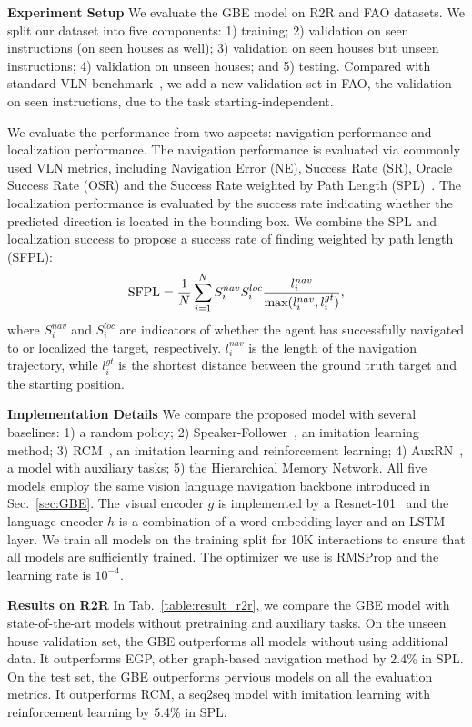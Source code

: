 \documentclass[final]{cvpr}
\begin{document}
\noindent\textbf{Experiment Setup}
We evaluate the GBE model on R2R and FAO datasets. 
We split our dataset into five components: 1) training; 2) validation on seen instructions (on seen houses as well); 3) validation on seen houses but unseen instructions; 4) validation on unseen houses; and 5) testing. Compared with standard VLN benchmark~\cite{anderson2018vision}, we add a new validation set in FAO, the validation on seen instructions, due to the task starting-independent. 

We evaluate the performance from two aspects: navigation performance and localization performance. The navigation performance is evaluated via commonly used VLN metrics, including Navigation Error (NE), Success Rate (SR), Oracle Success Rate (OSR) and the Success Rate weighted by Path Length (SPL)~\cite{anderson2018on}. 
The localization performance is evaluated by the success rate indicating whether the predicted direction is located in the bounding box. We combine the SPL and localization success to propose a success rate of finding weighted by path length (SFPL): 
\begin{equation}
    \textnormal{SFPL} = \frac{1}{N} \sum_{i=1}^{N} S^{nav}_i S^{loc}_i \frac{l^{nav}_i}{\textnormal{max}(l^{nav}_i, l^{gt}_i)}, 
\end{equation}
where $S^{nav}_i$ and $S^{loc}_i$ are indicators of whether the agent has successfully navigated to or localized the target, respectively. $l^{nav}_i$ is the length of the navigation trajectory, while $l^{gt}_i$ is the shortest distance between the ground truth target and the starting position. 

\noindent\textbf{Implementation Details}
We compare the proposed model with several baselines: 1) a random policy; 
2) Speaker-Follower~\cite{fried2018speaker}, an imitation learning method; 
3) RCM~\cite{wang2018reinforced}, an imitation learning and reinforcement learning; 
4) AuxRN~\cite{zhu2019vision}, a model with auxiliary tasks; 
5) the Hierarchical Memory Network. 
All five models employ the same vision language navigation backbone introduced in Sec.~\ref{sec:GBE}. 
The visual encoder $g$ is implemented by a Resnet-101~\cite{he2016deep} and the language encoder $h$ is a combination of a word embedding layer and an LSTM~\cite{hochreiter1997long} layer. 
We train all models on the training split for 10K interactions to ensure that all models are sufficiently trained. The optimizer we use is RMSProp and the learning rate is $10^{-4}$. 

\noindent\textbf{Results on R2R}
In Tab.~\ref{table:result_r2r}, we compare the GBE model with state-of-the-art models without pretraining and auxiliary tasks. 
On the unseen house validation set, the GBE outperforms all models without using additional data. 
It outperforms EGP, other graph-based navigation method by 2.4\% in SPL. 
On the test set, the GBE outperforms pervious models on all the evaluation metrics. 
It outperforms RCM, a seq2seq model with imitation learning with reinforcement learning by 5.4\% in SPL. 
\end{document}
